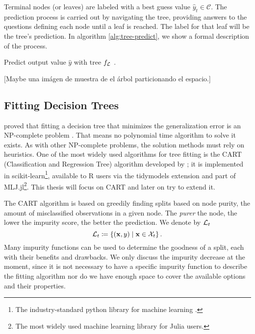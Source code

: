 Terminal nodes (or leaves) are labeled with a best guess value $\widehat{y}_t
\in \mathcal{C}$. The prediction process is carried out by navigating the tree,
providing answers to the questions defining each node until a leaf is reached.
The label for that leaf will be the tree's prediction. In algorithm
\ref{alg:tree-predict}, we show a formal description of the process.

\begin{algorithm}
    \caption{Predict output value $\widehat{y}$ with tree $f_{\mathcal{L}}$
        \cite[Ch.~3.2]{louppe2014}.}
    \label{alg:tree-predict}
\end{algorithm}

[Maybe una imágen de muestra de el árbol particionando el espacio.]

\subsection{Fitting Decision Trees}
\citeauthor{hyafil1976} proved that fitting a decision tree that minimizes the
generalization error is an NP-complete problem \cite{hyafil1976}. That means no
polynomial time algorithm to solve it exists. As with other NP-complete
problems, the solution methods must rely on heuristics. One of the most widely
used algorithms for tree fitting is the CART (Classification and Regression
Tree) algorithm developed by \citeauthor{breiman2017} \cite{breiman2017}; it is
implemented in scikit-learn\footnote{The industry-standard python library for
machine learning \cite{louppe2014}.}, available to R users via the tidymodels
extension and part of MLJ.jl\footnote{The most widely used machine learning
library for Julia users.}. This thesis will focus on CART and later on try to
extend it.

The CART algorithm is based on greedily finding splits based on node purity, the
amount of misclassified observations in a given node. The \textit{purer} the
node, the lower the impurity score, the better the prediction. We denote by
$\mathcal{L}_t$
\begin{equation*}
    \mathcal{L}_t \coloneqq \left\{ (\mathbf{x}, y) \mid \mathbf{x} \in \mathcal{X}_t \right\}.
\end{equation*}
Many impurity functions can be used to determine the goodness of a split, each
with their benefits and drawbacks. We only discuss the impurity decrease at the
moment, since it is not necessary to have a specific impurity function to
describe the fitting algorithm nor do we have enough space to cover the
available options and their properties.

